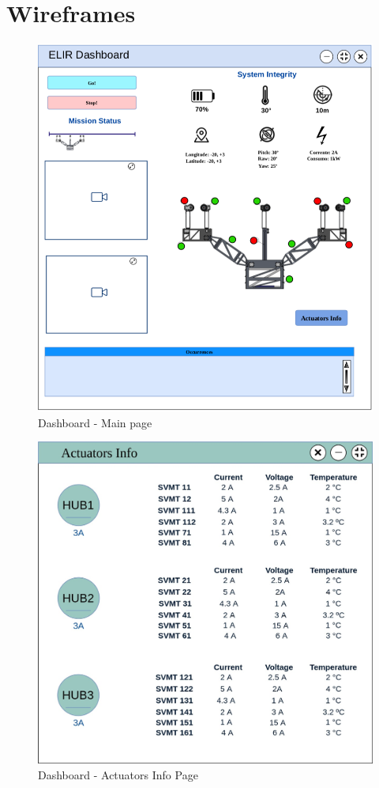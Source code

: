 
\chapter{Wireframes}
\label{Append:wireframes}

	\begin{figure}[!ht]
	\centering
	\includegraphics[width=14cm]{Figures/GUI_1.png}
	\caption{Dashboard - Main page} \label{UI}
	\end{figure}
	
	\begin{figure}[!ht]
	\centering
	\includegraphics[width=16cm]{Figures/GUI_2.jpg}
	\caption{Dashboard - Actuators Info Page} \label{UI2}
	\end{figure}

